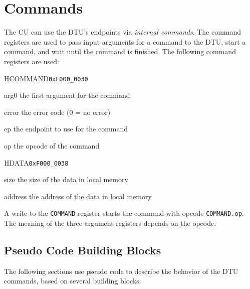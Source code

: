 \documentclass[a4paper,11pt,draft]{article}
\begin{document}
\section{Commands}

The CU can use the DTU's endpoints via \emph{internal commands}. The command registers are used to
pass input arguments for a command to the DTU, start a command, and wait until the command is
finished. The following command registers are used:

\begin{register}{H}{COMMAND}{\texttt{0xF000\_0030}}
  \regnewline%
  \begin{regdesc}\begin{reglist}
    \item[arg0] the first argument for the command
    \item[error] the error code (0 = no error)
    \item[ep] the endpoint to use for the command
    \item[op] the opcode of the command
  \end{reglist}\end{regdesc}
\end{register}

\begin{register}{H}{DATA}{\texttt{0xF000\_0038}}
  \regnewline%
  \begin{regdesc}\begin{reglist}
    \item[size] the size of the data in local memory
    \item[address] the address of the data in local memory
  \end{reglist}\end{regdesc}
\end{register}

\noindent A write to the \texttt{COMMAND} register starts the command with opcode
\texttt{COMMAND.op}. The meaning of the three argument registers depends on the opcode.

\subsection{Pseudo Code Building Blocks}

The following sections use pseudo code to describe the behavior of the DTU commands, based on
several building blocks:
\end{document}
